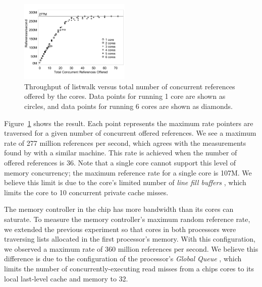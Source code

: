\documentclass[10pt,nocopyrightspace,preprint]{sigplanconf}
\begin{document}
{\begin{figure}[h]
	\begin{center}
		\includegraphics[width=0.47\textwidth]{figures/multi-listwalk-totalconc-edited.pdf}
	\end{center}
	\caption{Throughput of listwalk versus total number of
          concurrent references offered by the cores. Data points for
          running 1 core are shown as circles, and data points for
          running 6 cores are shown as diamonds. 
        }
	\label{fig:listwalk-totalconc}
\end{figure}

Figure~\ref{fig:listwalk-totalconc} shows the result. Each point represents
the maximum rate pointers are traversed for a given number of
concurrent offered references. We see a maximum rate of 277 million
references per second, which agrees with the measurements found by \cite{Mandal:2010} with a similar machine. This rate is achieved when the number of offered references is 36. Note that a single core cannot support this level of
memory concurrency; the maximum reference rate for a single core is
107M. We believe this limit is due to the core's limited number of {\em line fill
  buffers} \cite{nehalem:arch}, which limits the core to 10
concurrent private cache misses.

The memory controller in the chip has more bandwidth than its
cores can saturate. To measure the memory controller's maximum random
reference rate, we extended the previous experiment so that cores in
both processors were traversing lists allocated in the first processor's
memory. With this configuration, we observed a maximum rate of 360
million references per second. We believe this difference is due to
the configuration of the processor's {\em Global Queue} \cite{nehalem:perf}, which limits the number of concurrently-executing read misses from a chips cores to its local last-level cache and memory to 32.


}
\end{document}
